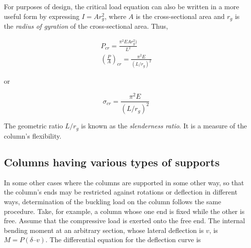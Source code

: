 \documentclass[
10pt,
a4paper,
openany,
svgnames,
]{book} %
\begin{document}
For purposes of design, the critical load equation can also be written in a more useful form by expressing $I = Ar_g^2$, where $A$ is the cross-sectional area and $r_g$ is the \emph{radius of gyration} of the cross-sectional area. Thus,

\begin{gather*}
  P_{cr} = \frac{\pi^2EAr_g^2)}{L^2} \\ 
  \left( \frac{P}{A} \right)_{cr} = \frac{\pi ^2E}{(L/r_g)^2}
\end{gather*}

or

\begin{equation}
  \sigma_{cr} = \frac{\pi ^2E}{(L/r_g)^2}
\end{equation}

The geometric ratio $L/r_g$ is known as the \emph{slenderness ratio}. It is a measure of the column’s flexibility.

\subsection{Columns having various types of supports}

In some other cases where the columns are supported in some other way, so that the column’s ends may be restricted against rotations or deflection in different ways, determination of the buckling load on the column follows the same procedure. Take, for example, a column whose one end is fixed while the other is free. Assume that the compressive load is exerted onto the free end. The internal bending moment at an arbitrary section, whose lateral deflection is $v$, is $M = P(\delta – v)$. The differential equation for the deflection curve is

  \begin{figure}[H]
    \centering
  \end{figure}
\end{document}

